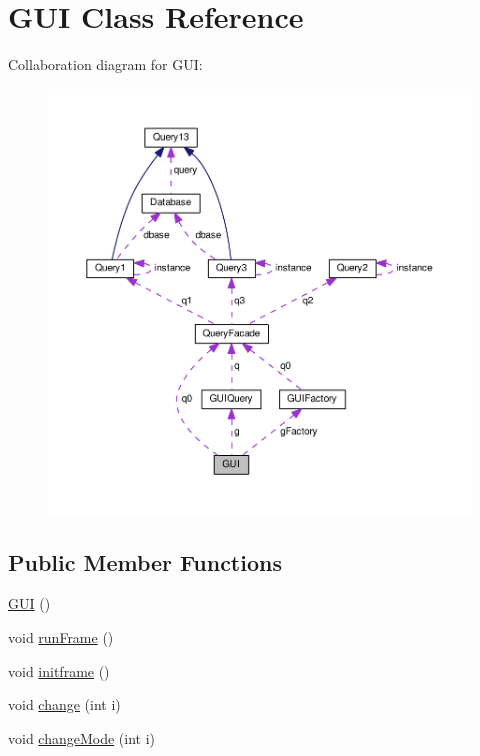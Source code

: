 \hypertarget{classGUI}{}\section{G\+UI Class Reference}
\label{classGUI}


Collaboration diagram for G\+UI\+:\nopagebreak
\begin{figure}[H]
\begin{center}
\leavevmode
\includegraphics[width=350pt]{classGUI__coll__graph}
\end{center}
\end{figure}
\subsection*{Public Member Functions}
\begin{DoxyCompactItemize}
\item 
\hyperlink{classGUI_a35a15f9dcfca9111335e4401a46567ed}{G\+UI} ()
\item 
void \hyperlink{classGUI_a23acbb0a9e9350e946407b677e88b5b5}{run\+Frame} ()
\item 
void \hyperlink{classGUI_a110149939fa2b371bcc1f86b15aa2f63}{initframe} ()
\item 
void \hyperlink{classGUI_aff3d813da1e25b7926c7b340ed57009b}{change} (int i)
\item 
void \hyperlink{classGUI_a2ecefd4112807c7f4d96e49b1cf0a46c}{change\+Mode} (int i)
\end{DoxyCompactItemize}
